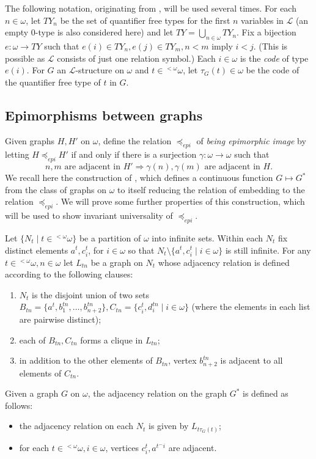 \documentclass{amsart}
\theoremstyle{definition}
\theoremstyle{remark}
\begin{document}
The following notation, originating from \cite{frista1989}, will be
used several times. For each $n \in \omega $, let $TY_n$ be the set of
quantifier free types for the first $n$ variables in ${\mathcal{L}}$ (an empty
$0$-type is also considered here) and let $TY = \bigcup_{n\in\omega}
TY_n$. Fix a bijection $e \colon \omega \to TY$ such that $e(i) \in
TY_n, e(j) \in TY_m, n<m$ imply $i<j$. (This is possible as $ \mathcal
L $ consists of just one relation symbol.) Each $i \in \omega$ is the
\emph{code} of type $e(i)$. For $G$ an ${\mathcal{L}}$-structure on $\omega$ and
$t \in {{}^{<\omega}\omega}$, let $\tau_G (t) \in \omega$ be the code of the
quantifier free type of $t$ in $G$.

\subsection{Epimorphisms between graphs}\label{ref1}
Given graphs $H,H'$ on $\omega $, define the relation $\preceq_{epi}$ of \emph{being
epimorphic image} by letting $H\preceq_{epi}H'$ if and only if there is a surjection $\gamma \colon \omega\to\omega $ such that
\[ n,m \mbox{ are adjacent in } H'\Rightarrow \gamma (n),\gamma (m) \mbox{ are adjacent in } H. \]
We recall here the construction of \cite[Theorem 1]{Camerlo2005},
which defines a continuous function $G\mapsto G^*$ from the class of
graphs on $\omega $ to itself reducing the relation of embedding to the relation $\preceq_{epi}$.
We will prove some further properties of this construction, which will
be used to show invariant universality of $\preceq_{epi}$.

Let $\{ N_t  \mid t\in {{}^{<\omega}\omega} \}$ be a partition of $\omega $ into
infinite sets.
Within each $N_t$ fix distinct elements $a^t,c_i^t$, for $i \in \omega$
so that $N_t \setminus \{ a^t,c_i^t \mid i\in\omega \}$ is still infinite.
For any $t \in {{}^{<\omega}\omega} , n\in\omega $ let $L_{tn}$ be a graph on $N_t$ whose adjacency relation is defined according to the following clauses:
\begin{enumerate}
\item $N_t$ is the disjoint union of two sets $B_{tn}= \{ a^t,b_1^{tn},
  \dotsc ,b_{n+2}^{tn}\},C_{tn}=\{ c_i^t,d_i^{tn}\mid i\in\omega\} $ (where the elements in each list are pairwise distinct);
\item each of $B_{tn},C_{tn}$ forms a clique in $L_{tn}$;
\item in addition to the other elements of $B_{tn}$, vertex
  $b_{n+2}^{tn}$ is adjacent to all elements of $C_{tn}$.
\end{enumerate}
Given a graph $G$ on $\omega $, the adjacency relation on the graph $G^*$ is defined as follows:
\begin{itemize}
\item the adjacency relation on each $N_t$ is given by $L_{t\tau_G(t)}$;
\item for each $t\in {{}^{<\omega}\omega} , i\in\omega $, vertices $c_i^t,a^{t^{\smallfrown }i}$ are adjacent.
\end{itemize}
\end{document}
